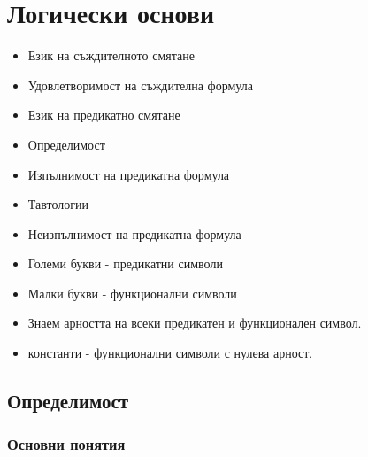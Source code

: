 \chapter{Логически основи}


\begin{itemize}
\item
  Език на съждителното смятане
\item
  Удовлетворимост на съждителна формула
\item
  Език на предикатно смятане
\item
  Определимост
\item
  Изпълнимост на предикатна формула
\item
  Тавтологии
\item
  Неизпълнимост на предикатна формула
\end{itemize}

\begin{itemize}
\item
  Големи букви - предикатни символи
\item
  Малки букви - функционални символи
\item
  Знаем арността на всеки предикатен и функционален символ.
\item
  константи - функционални символи с нулева арност.
\end{itemize}

\section{Определимост}


\subsection{Основни понятия}


